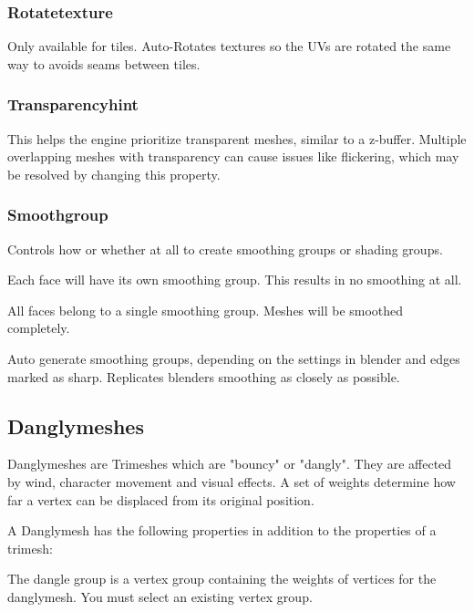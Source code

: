 \subsubsection*{Rotatetexture}
Only available for tiles. Auto-Rotates textures so the UVs are rotated
the same way to avoids seams between tiles.

\subsubsection*{Transparencyhint}
This helps the engine prioritize transparent meshes, similar to a z-buffer.
Multiple overlapping meshes with transparency can cause issues like
flickering, which may be resolved by changing this property.

\subsubsection*{Smoothgroup}
Controls how or whether at all to create smoothing groups or shading groups.
\begin{description}[leftmargin=6em,style=nextline]
    \item[Separate] Each face will have its own smoothing group. This results in no smoothing at all.
    \item[Single] All faces belong to a single smoothing group. Meshes will be smoothed completely.
    \item[Auto] Auto generate smoothing groups, depending on the settings in blender and edges marked as sharp. Replicates blenders smoothing as closely as possible.
\end{description}

\subsection{Danglymeshes}
Danglymeshes are Trimeshes which are "bouncy" or "dangly". They are affected by
wind, character movement and visual effects. A set of weights determine how far a 
vertex can be displaced from its original position.

A Danglymesh has the following properties in addition to the properties of a 
trimesh:
\begin{description}[leftmargin=6em,style=nextline]
    \item[Dangle group] The dangle group is a vertex group containing the weights of vertices for the danglymesh. You must select an existing vertex group.
    \item[Period]
    \item[Tightness]
    \item[Displacement]
\end{description}

